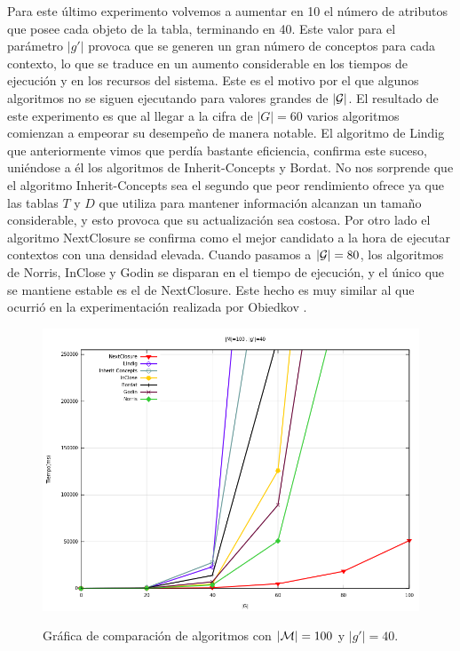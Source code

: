 \documentclass[oneside,openright,titlepage,numbers=noenddot,openany,headinclude,footinclude=true,
cleardoublepage=empty,abstractoff,BCOR=5mm,paper=a4,fontsize=12pt,main=spanish]{scrreprt}
\begin{document}
\begin{itemize}
Para este último experimento volvemos a aumentar en 10 el número de atributos que posee cada objeto de la tabla, terminando en 40. Este valor para el parámetro $|g'|$ provoca que se generen un gran número de conceptos para cada contexto, lo que se traduce en un aumento considerable en los tiempos de ejecución y en los recursos del sistema. Este es el motivo por el que algunos algoritmos no se siguen ejecutando para valores grandes de $|\mathcal{G}|$.  El resultado de este experimento es que al llegar a la cifra de $|G|=60$ varios algoritmos comienzan a empeorar su desempeño de manera notable. El algoritmo de Lindig que anteriormente vimos que perdía bastante eficiencia, confirma este suceso, uniéndose a él los algoritmos de Inherit-Concepts y Bordat. No nos sorprende que el algoritmo Inherit-Concepts sea el segundo que peor rendimiento ofrece ya que las tablas $T$ y $D$ que utiliza para mantener información alcanzan un tamaño considerable, y esto provoca que su actualización sea costosa. Por otro lado el algoritmo NextClosure se confirma como el mejor candidato a la hora de ejecutar contextos con una densidad elevada. Cuando pasamos a $|\mathcal{G}|=80$, los algoritmos de Norris, InClose y Godin se disparan en el tiempo de ejecución, y el único que se mantiene estable es el de NextClosure. Este hecho es muy similar al que ocurrió en la experimentación realizada por Obiedkov \cite{comparingperformance}.

\begin{figure}[H]
  \centering
  \includegraphics[scale=0.5]{images/M100g40G20100.png}
  \label{fig:m100g40g20100}
\caption{Gráfica de comparación de algoritmos con $|\mathcal{M}|=100$ y $|g'|=40$.}
\end{figure}



\end{itemize}
\end{document}
